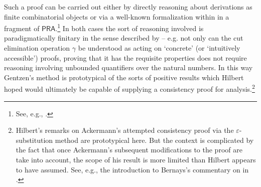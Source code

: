 \documentclass[11pt,fleqn,leqno]{article}
\begin{document}
Such a proof can be carried out either by directly reasoning about derivations as finite combinatorial objects or via a well-known formalization within in a fragment of $\mathsf{PRA}$.\footnote{See, e.g., \citep[\S 3c, \S 5d]{Hajek1998}.}   In both cases the sort of reasoning involved is paradigmatically finitary in the sense described by \citet{Hilbert1934} -- e.g. not only can the cut elimination operation $\gamma$  be understood as acting on `concrete' (or `intuitively accessible') proofs, proving that it has the requisite properties does not require reasoning involving unbounded quantifiers over the natural numbers.    In this way Gentzen's method is prototypical of the sorts of positive results which Hilbert hoped would ultimately be capable of supplying a consistency proof for analysis.\footnote{Hilbert's remarks on Ackermann's attempted consistency proof \citeyearpar[pp. 477-479]{Hilbert1927} via the $\varepsilon$-substitution method are prototypical here.   But the context is complicated by the fact that once Ackermann's subsequent modifications to the proof are take into account, the scope of his result is more limited than Hilbert appears to have assumed.  See, e.g., the introduction to Bernays's commentary on \citeyearpar{Hilbert1927} in \citep[p. 485-486]{Heijenoort1967}.} 
 
\end{document}
